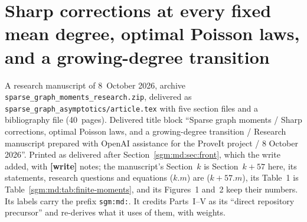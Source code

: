 \documentclass[11pt,letterpaper]{article}
\theoremstyle{remark}\newtheorem{remark}[theorem]{Remark}
\newcommand{\Poi}{\operatorname{Poisson}}\newcommand{\Bin}{\operatorname{Bin}}
\newcommand{\fall}[2]{(#1)_{#2}}\newcommand{\rise}[2]{#1^{\overline{#2}}}
\newcommand{\Stir}[2]{\left\{\begin{matrix}#1\\#2\end{matrix}\right\}}
\newcommand{\file}[1]{\nolinkurl{#1}}
\newcommand{\partsource}[1]{\par\noindent\begin{minipage}{\textwidth}\small #1\end{minipage}\par\medskip}
\theoremstyle{definition}\newtheorem{definition}[theorem]{Definition}
\begin{document}
\clearpage
\part{Sharp corrections at every fixed mean degree, optimal Poisson laws, and a growing-degree transition}\label{sgm:md:part}
\renewcommand{\Poi}{\operatorname{Pois}}
\renewcommand{\Stir}[2]{\genfrac{\{}{\}}{0pt}{}{#1}{#2}}
\renewcommand{\Part}{\mathcal P}
\renewcommand{\fall}[2]{{#1}^{\underline{#2}}}
\renewcommand{\rise}[2]{{#1}^{\overline{#2}}}
\renewcommand{\P}{\mathbb P}
\partsource{A research manuscript of 8~October 2026, archive
\file{sparse_graph_moments_research.zip}, delivered as
\file{sparse_graph_asymptotics/article.tex} with five section files and a
bibliography file (40~pages). Delivered title block ``Sparse graph moments /
Sharp corrections, optimal Poisson laws, and a growing-degree transition /
Research manuscript prepared with OpenAI assistance for the ProveIt project /
8 October 2026''. Printed as delivered after
Section~\ref{sgm:md:sec:front}, which the write added, with
\textbf{[write]} notes; the manuscript's Section~$k$ is Section~$k+57$ here,
its statements, research questions and equations ($k.m$) are ($k{+}57.m$),
its Table~1 is Table~\ref{sgm:md:tab:finite-moments}, and its Figures~1
and~2 keep their numbers. Its labels carry the prefix \file{sgm:md:}. It
credits Parts~I--V as its ``direct repository precursor'' and re-derives
what it uses of them, with weights.}
\end{document}
